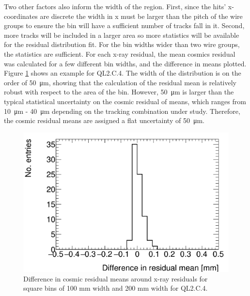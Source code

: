 Two other factors also inform the width of the region. First, since the hits' x-coordinates are discrete the width in x must be larger than the pitch of the wire groups to ensure the bin will have a sufficient number of tracks fall in it. Second, more tracks will be included in a larger area so more statistics will be available for the residual distribution fit. For the bin widths wider than two wire groups, the statistics are sufficient. For each x-ray residual, the mean cosmics residual was calculated for a few different bin widths, and the difference in means plotted. Figure \ref{fig:area_bin_size_mean_diff} shows an example for QL2.C.4. The width of the distribution is on the order of \SI{50}{\micro\meter}, showing that the calculation of the residual mean is relatively robust with respect to the area of the bin. However, \SI{50}{\micro\meter} is larger than the typical statistical uncertainty on the cosmic residual of means, which ranges from \SI{10}{\micro\meter} - \SI{40}{\micro\meter} depending on the tracking combination under study. Therefore, the cosmic residual means are assigned a flat uncertainty of \SI{50}{\micro\meter}. 

\begin{figure}
    \centering
    \includegraphics[width = \textwidth]{figures/compare_residual_fits_around_xrays_QL2C04_3100V_2021-05-20_100mm_width_bins_minus_QL2C04_3100V_2021-06-02_200mm_width_bins_means_difference.png}
    \caption{Difference in cosmic residual means around x-ray residuals for square bins of 100 mm width and 200 mm width for QL2.C.4.}
    \label{fig:area_bin_size_mean_diff}
\end{figure}

